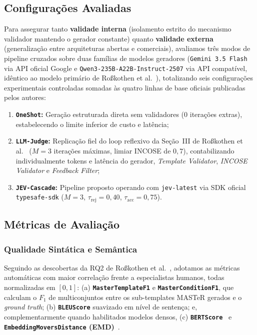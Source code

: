 \subsection{Configurações Avaliadas}
Para assegurar tanto \textbf{validade interna} (isolamento estrito do mecanismo validador mantendo o gerador constante) quanto \textbf{validade externa} (generalização entre arquiteturas abertas e comerciais), avaliamos três modos de pipeline cruzados sobre duas famílias de modelos geradores (\texttt{Gemini 3.5 Flash} via API oficial Google e \texttt{Qwen3-235B-A22B-Instruct-2507} via API compatível, idêntico ao modelo primário de Ro\ss kothen et al.~\cite{rosskothen2026converting}), totalizando seis configurações experimentais controladas somadas às quatro linhas de base oficiais publicadas pelos autores:
\begin{enumerate}
    \item \textbf{\texttt{OneShot}:} Geração estruturada direta sem validadores ($0$ iterações extras), estabelecendo o limite inferior de custo e latência;
    \item \textbf{\texttt{LLM-Judge}:} Replicação fiel do loop reflexivo da Seção~III de Ro\ss kothen et al.~\cite{rosskothen2026converting} ($M = 3$ iterações máximas, limiar INCOSE de $0{,}7$), contabilizando individualmente tokens e latência do gerador, \textit{Template Validator}, \textit{INCOSE Validator} e \textit{Feedback Filter};
    \item \textbf{\texttt{JEV-Cascade}:} Pipeline proposto operando com \texttt{jev-latest} via SDK oficial \texttt{typesafe-sdk} ($M = 3$, $\tau_{\text{rej}} = 0{,}40$, $\tau_{\text{acc}} = 0{,}75$).
\end{enumerate}

\subsection{Métricas de Avaliação}
\subsubsection{Qualidade Sintática e Semântica}
Seguindo as descobertas da RQ2 de Ro\ss kothen et al.~\cite{rosskothen2026converting}, adotamos as métricas automáticas com maior correlação frente a especialistas humanos, todas normalizadas em $[0, 1]$: (a) \textbf{\texttt{MasterTemplateF1}} e \textbf{\texttt{MasterConditionF1}}, que calculam o $F_1$ de multiconjuntos entre os sub-templates MASTeR gerados e o \textit{ground truth}; (b) \textbf{\texttt{BLEUScore}} suavizado em nível de sentença; e, complementarmente quando habilitados modelos densos, (c) \textbf{\texttt{BERTScore}}~\cite{zhang2020bertscore} e \textbf{\texttt{EmbeddingMoversDistance} (EMD)}~\cite{kusner2015word}.


